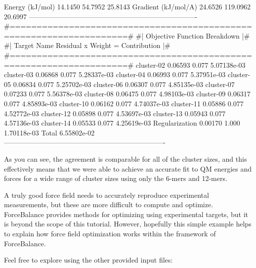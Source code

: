 \begin{DoxyVerb}
    Energy (kJ/mol)                14.1450       54.7952     25.8143%
    Gradient (kJ/mol/A)            24.6526      119.0962     20.6997%
-------------------------------------------------------------------------
#====================================================================#
#|                   Objective Function Breakdown                   |#
#|   Target Name              Residual  x  Weight  =  Contribution  |#
#====================================================================#
cluster-02                     0.06593      0.077      5.07138e-03 
cluster-03                     0.06868      0.077      5.28337e-03 
cluster-04                     0.06993      0.077      5.37951e-03 
cluster-05                     0.06834      0.077      5.25702e-03 
cluster-06                     0.06307      0.077      4.85135e-03 
cluster-07                     0.07233      0.077      5.56378e-03 
cluster-08                     0.06475      0.077      4.98103e-03 
cluster-09                     0.06317      0.077      4.85893e-03 
cluster-10                     0.06162      0.077      4.74037e-03 
cluster-11                     0.05886      0.077      4.52772e-03 
cluster-12                     0.05898      0.077      4.53697e-03 
cluster-13                     0.05943      0.077      4.57136e-03 
cluster-14                     0.05533      0.077      4.25619e-03 
Regularization                 0.00170      1.000      1.70118e-03 
Total                                                  6.55802e-02 
----------------------------------------------------------------------
\end{DoxyVerb}


As you can see, the agreement is comparable for all of the cluster sizes, and this effectively means that we were able to achieve an accurate fit to Q\-M energies and forces for a wide range of cluster sizes using only the 6-\/mers and 12-\/mers.

A truly good force field needs to accurately reproduce experimental measurements, but these are more difficult to compute and optimize. Force\-Balance provides methods for optimizing using experimental targets, but it is beyond the scope of this tutorial. However, hopefully this simple example helps to explain how force field optimization works within the framework of Force\-Balance.

Feel free to explore using the other provided input files\-:

